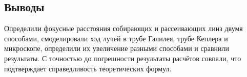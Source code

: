 \documentclass[a4paper,12pt]{article}
\begin{document}
\subsection*{Выводы}
Определили фокусные расстояния собирающих и рассеивающих линз двумя способами, смоделировали ход лучей в трубе Галилея, трубе Кеплера и микроскопе, определили их увеличение разными способами и сравнили результаты. С точностью до погрешности результаты расчётов совпали, что подтверждает справедливость теоретических формул.
\end{document}
